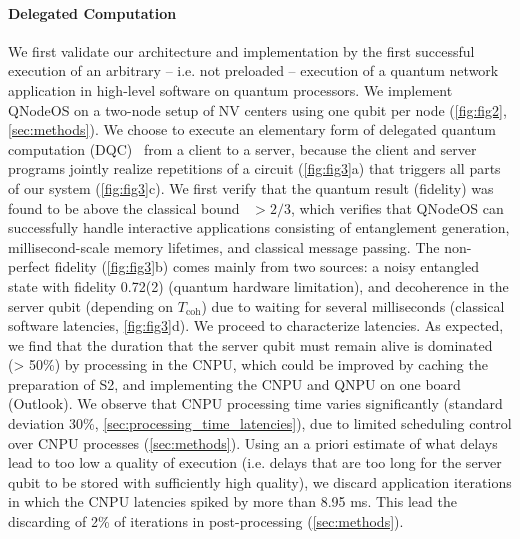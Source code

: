 \paragraph{Delegated Computation}
We first validate our architecture and implementation by the first successful execution of an arbitrary – i.e. not preloaded – execution of a quantum network application in high-level software on quantum processors. We implement QNodeOS on a two-node setup of NV centers using one qubit per node (\cref{fig:fig2}, \cref{sec:methods}). We choose to execute an elementary form of delegated quantum computation (DQC)~\cite{broadbent_2009_ubqc} from a client to a server, because the client and server programs jointly realize repetitions of a circuit (\cref{fig:fig3}a) that triggers all parts of our system (\cref{fig:fig3}c). 
We first verify that the quantum result (fidelity) was found to be above the classical bound~\cite{massar_optimal_1995} $> 2/3$, which verifies that QNodeOS can successfully handle interactive applications consisting of entanglement generation, millisecond-scale memory lifetimes, and classical message passing. The non-perfect fidelity (\cref{fig:fig3}b) comes mainly from two sources: a noisy entangled state with fidelity 0.72(2) (quantum hardware limitation), and decoherence in the server qubit (depending on $T_{\text{coh}}$) due to waiting for several milliseconds (classical software latencies, \cref{fig:fig3}d).
We proceed to characterize latencies. As expected, we find that the duration that the server qubit must remain alive is dominated (> 50\%) by processing in the CNPU, which could be improved by caching the preparation of S2, and implementing the CNPU and QNPU on one board (Outlook). We observe that CNPU processing time varies significantly (standard deviation 30\%, \cref{sec:processing_time_latencies}), due to limited scheduling control over CNPU processes (\cref{sec:methods}).  Using an a priori estimate of what delays lead to too low a quality of execution (i.e. delays that are too long for the server qubit to be stored with sufficiently high quality), we discard application iterations in which the CNPU latencies spiked by more than 8.95 ms. This lead the discarding of 2\% of iterations in post-processing (\cref{sec:methods}).

